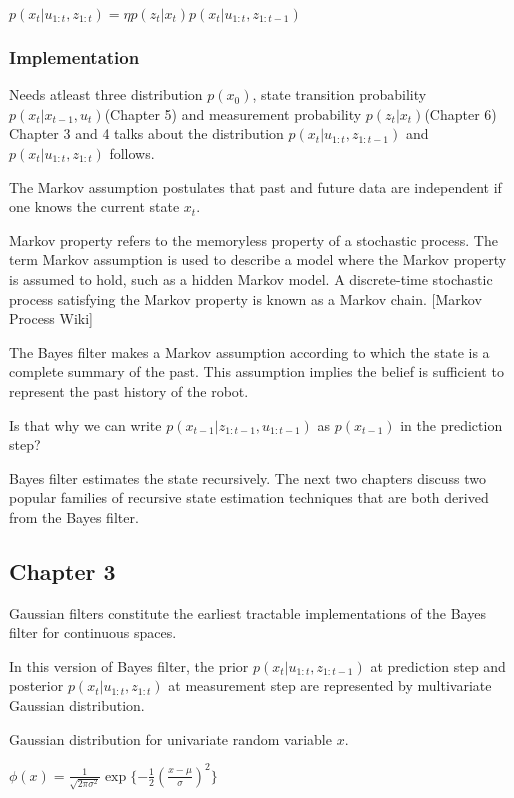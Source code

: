 \documentclass{article}
\begin{document}
$p(x_t | u_{1:t}, z_{1:t}) = \eta p(z_t | x_t) p(x_t | u_{1:t}, z_{1:t-1})$

\subsubsection{Implementation}

Needs atleast three distribution $p(x_0)$, state transition probability $p(x_t | x_{t-1}, u_t)$(Chapter 5) and measurement probability $p(z_t | x_t)$(Chapter 6) Chapter 3 and 4 talks about the distribution $p(x_t | u_{1:t}, z_{1:t-1})$ and $p(x_t | u_{1:t}, z_{1:t})$ follows.

The Markov assumption postulates that past and future data are independent
if one knows the current state $x_t$.

Markov property refers to the memoryless property of a stochastic process. The term Markov assumption is used to describe a model where the Markov property is assumed to hold, such as a hidden Markov model. A discrete-time stochastic process satisfying the Markov property is known as a Markov chain. [Markov Process Wiki]

The Bayes filter makes a Markov assumption according to which the state
is a complete summary of the past. This assumption implies the belief is
sufficient to represent the past history of the robot.

Is that why we can write $p(x_{t-1} | z_{1:t-1}, u_{1:t-1})$ as $p(x_{t-1})$ in the prediction step?

Bayes filter estimates the state recursively. The next two chapters discuss two popular families of recursive state estimation techniques that are both derived from the Bayes filter.

\subsection{Chapter 3}

Gaussian filters constitute the earliest tractable implementations of the Bayes filter for continuous spaces.

In this version of Bayes filter, the prior $p(x_t | u_{1:t}, z_{1:t-1})$ at prediction step and posterior $p(x_t | u_{1:t}, z_{1:t})$ at measurement step are represented by multivariate Gaussian distribution.

Gaussian distribution for univariate random variable $x$.

$\phi(x) = \frac{1}{\sqrt{2\pi \sigma^2}} \exp\{-\frac{1}{2}(\frac{x-\mu}{\sigma})^2\}$
\end{document}
